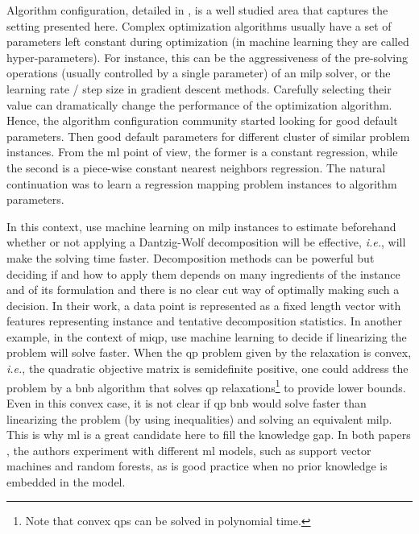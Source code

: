\documentclass[11pt]{article}
\begin{document}
		Algorithm configuration, detailed in \cite{HoosAutomated2012, BischlAslib2016}, is a well studied area that captures the setting presented here.
		Complex optimization algorithms usually have a set of parameters left constant during optimization
		(in machine learning they are called hyper-parameters).
		For instance, this can be the aggressiveness of the pre-solving operations (usually controlled by a
		single parameter) of an \gls{milp} solver, or the learning rate / step size in gradient descent
		methods.
		Carefully selecting their value can dramatically change the performance of the optimization
		algorithm.
		Hence, the algorithm configuration community started looking for good default parameters.
		Then good default parameters for different cluster of similar problem instances.
		From the \gls{ml} point of view, the former is a constant regression, while the second is a
		piece-wise constant nearest neighbors regression.
		The natural continuation was to learn a regression mapping problem instances to algorithm
		parameters.

		In this context, \cite{KruberLearningWhenUse2017} use machine learning on \gls{milp} instances to
		estimate beforehand whether or not applying a Dantzig-Wolf decomposition will be effective,
		\textit{i.e.}, will make the solving time faster.
		Decomposition methods can be powerful but deciding if and how to apply them depends on many
		ingredients of the instance and of its formulation and there is no clear cut way of optimally
		making such a decision.
		In their work, a data point is represented as a fixed length vector with features representing
		instance and tentative decomposition statistics.
		In another example, in the context of \acrlong{miqp},
		\cite{BonamiLearningClassificationMixedInteger2018} use machine learning to decide if linearizing
		the problem will solve faster.
		When the \gls{qp} problem given by the relaxation is convex, \textit{i.e.}, the quadratic objective
		matrix is semidefinite positive, one could address the problem by a \gls{bnb} algorithm that solves
		\gls{qp} relaxations\footnote{
		    Note that convex \glspl{qp} can be solved in polynomial time.
		} to provide lower bounds.
		Even in this convex case, it is not clear if \gls{qp} \gls{bnb} would solve faster than linearizing
		the problem (by using \cite{McCormickComputabilityglobalsolutions1976} inequalities) and solving an
		equivalent \gls{milp}.
		This is why \gls{ml} is a great candidate here to fill the knowledge gap.
		In both papers \citep{KruberLearningWhenUse2017, BonamiLearningClassificationMixedInteger2018}, the
		authors experiment with different \gls{ml} models, such as support vector machines and random
		forests, as is good practice when no prior knowledge is embedded in the model.
\end{document}
